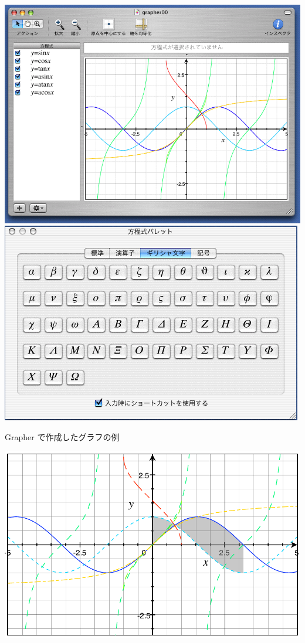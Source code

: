 \begin{center}
 \includegraphics[scale=.4]{images/Grapher01}%
 \includegraphics[scale=.4]{images/Grapher02}
\end{center}

Grapher で作成したグラフの例

\begin{center}
 \includegraphics[scale=.4]{images/grapher00}
\end{center}



